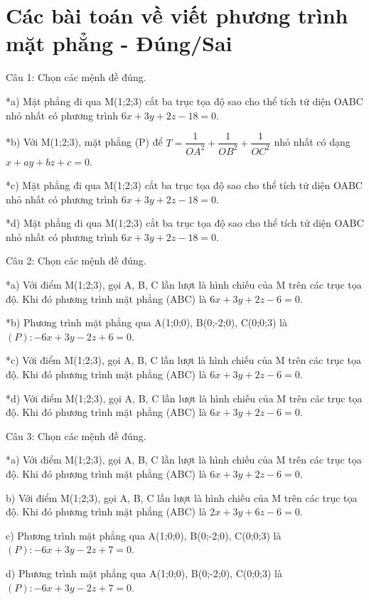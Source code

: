 \documentclass[a4paper,12pt]{article}
\begin{document}
\section*{Các bài toán về viết phương trình mặt phẳng - Đúng/Sai}

Câu 1: Chọn các mệnh đề đúng.

*a) Mặt phẳng đi qua M(1;2;3) cắt ba trục tọa độ sao cho thể tích tứ diện OABC nhỏ nhất có phương trình $6x+3y+2z-18=0$.

*b) Với M(1;2;3), mặt phẳng (P) để $T=\dfrac{1}{OA^2}+\dfrac{1}{OB^2}+\dfrac{1}{OC^2}$ nhỏ nhất có dạng $x+ay+bz+c=0$.

*c) Mặt phẳng đi qua M(1;2;3) cắt ba trục tọa độ sao cho thể tích tứ diện OABC nhỏ nhất có phương trình $6x+3y+2z-18=0$.

*d) Mặt phẳng đi qua M(1;2;3) cắt ba trục tọa độ sao cho thể tích tứ diện OABC nhỏ nhất có phương trình $6x+3y+2z-18=0$.



Câu 2: Chọn các mệnh đề đúng.

*a) Với điểm M(1;2;3), gọi A, B, C lần lượt là hình chiếu của M trên các trục tọa độ. Khi đó phương trình mặt phẳng (ABC) là $6x+3y+2z-6=0$.

*b) Phương trình mặt phẳng qua A(1;0;0), B(0;-2;0), C(0;0;3) là $(P): -6x + 3y - 2z + 6 = 0$.

*c) Với điểm M(1;2;3), gọi A, B, C lần lượt là hình chiếu của M trên các trục tọa độ. Khi đó phương trình mặt phẳng (ABC) là $6x+3y+2z-6=0$.

*d) Với điểm M(1;2;3), gọi A, B, C lần lượt là hình chiếu của M trên các trục tọa độ. Khi đó phương trình mặt phẳng (ABC) là $6x+3y+2z-6=0$.



Câu 3: Chọn các mệnh đề đúng.

*a) Với điểm M(1;2;3), gọi A, B, C lần lượt là hình chiếu của M trên các trục tọa độ. Khi đó phương trình mặt phẳng (ABC) là $6x+3y+2z-6=0$.

b) Với điểm M(1;2;3), gọi A, B, C lần lượt là hình chiếu của M trên các trục tọa độ. Khi đó phương trình mặt phẳng (ABC) là $2x+3y+6z-6=0$.

c) Phương trình mặt phẳng qua A(1;0;0), B(0;-2;0), C(0;0;3) là $(P): -6x + 3y - 2z + 7 = 0$.

d) Phương trình mặt phẳng qua A(1;0;0), B(0;-2;0), C(0;0;3) là $(P): -6x + 3y - 2z + 7 = 0$.
\end{document}
